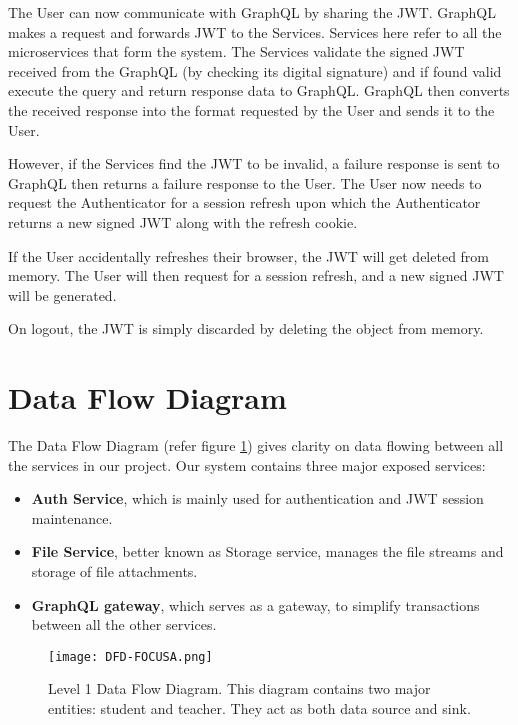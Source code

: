 The User can now communicate with GraphQL by sharing the JWT.
GraphQL makes a request and forwards JWT to the Services. Services here refer to all the microservices that form the system.
The Services validate the signed JWT received from the GraphQL (by checking its digital signature) 
and if found valid execute the query and return response data to GraphQL.
GraphQL then converts the received response into the format requested by the User and sends it to the User.

However, if the Services find the JWT to be invalid, a failure response is sent to
GraphQL then returns a failure response to the User.
The User now needs to request the Authenticator for a session refresh upon which the Authenticator
returns a new signed JWT along with the refresh cookie.

If the User accidentally refreshes their browser, the JWT will get deleted from memory. 
The User will then request for a session refresh, and a new signed JWT will be generated.

On logout, the JWT is simply discarded by deleting the object from memory.

\section{Data Flow Diagram}

The Data Flow Diagram (refer figure \ref{fig:dfd}) gives clarity on data flowing between all the services in our project. 
Our system contains three major exposed services:
\begin{itemize}
    \item \textbf{Auth Service}, which is mainly used for authentication and JWT session maintenance.
    \item \textbf{File Service}, better known as Storage service, manages the file streams and storage of file attachments.
    \item \textbf{GraphQL gateway}, which serves as a gateway, to simplify transactions between all the other services.
\end{itemize}

\begin{figure}[h!]
    \begin{center}
        \texttt{[image: DFD-FOCUSA.png]}
    \end{center}
    \caption{Level 1 Data Flow Diagram. This diagram contains two major entities: student and teacher. 
    They act as both data source and sink.}
    \label{fig:dfd}
\end{figure}

